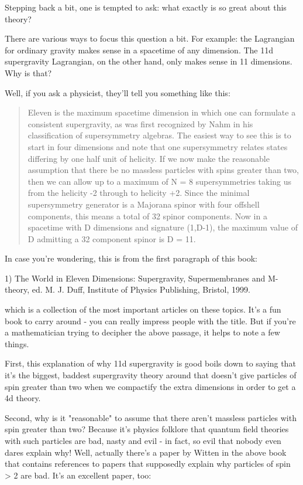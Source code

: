 Stepping back a bit, one is tempted to ask: what exactly is so great 
about this theory?   
 
There are various ways to focus this question a bit.  For example: the 
Lagrangian for ordinary gravity makes sense in a spacetime of any 
dimension.  The 11d supergravity Lagrangian, on the other hand, only 
makes sense in 11 dimensions.   Why is that?   
 
Well, if you ask a physicist, they'll tell you something like this: 
 
\begin{quote}
    Eleven is the maximum spacetime dimension in which one can formulate 
    a consistent supergravity, as was first recognized by Nahm in his 
    classification of supersymmetry algebras.  The easiest way to see this 
    is to start in four dimensions and note that one supersymmetry relates 
    states differing by one half unit of helicity.  If we now make the  
    reasonable assumption that there be no massless particles with spins 
    greater than two, then we can allow up to a maximum of N = 8  
    supersymmetries taking us from the helicity -2 through to helicity +2. 
    Since the minimal supersymmetry generator is a Majorana spinor with 
    four offshell components, this means a total of 32 spinor components. 
    Now in a spacetime with D dimensions and signature (1,D-1), the 
    maximum value of D admitting a 32 component spinor is D = 11. 
\end{quote}
    

In case you're wondering, this is from the first paragraph of this book: 
 
1) The World in Eleven Dimensions: Supergravity, Supermembranes and 
M-theory, ed. M. J. Duff, Institute of Physics Publishing, Bristol, 
1999. 
 
which is a collection of the most important articles on these topics. 
It's a fun book to carry around - you can really impress people with the 
title.  But if you're a mathematician trying to decipher the above 
passage, it helps to note a few things. 
 
First, this explanation of why 11d supergravity is good boils down to 
saying that it's the biggest, baddest supergravity theory around that 
doesn't give particles of spin greater than two when we compactify the 
extra dimensions in order to get a 4d theory.   
 
Second, why is it "reasonable" to assume that there aren't massless 
particles with spin greater than two?  Because it's physics folklore 
that quantum field theories with such particles are bad, nasty and evil 
- in fact, so evil that nobody even dares explain why!  Well, actually 
there's a paper by Witten in the above book that contains references to 
papers that supposedly explain why particles of spin > 2 are bad.  It's  
an excellent paper, too: 
 
